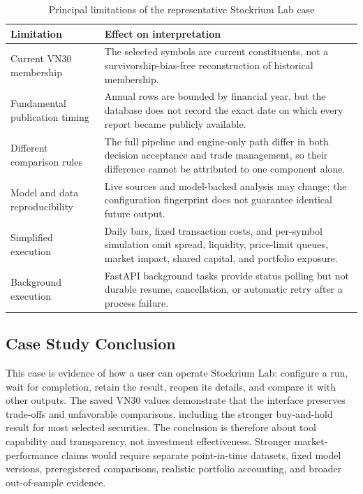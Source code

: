 \begin{table}[H]
    \centering
    \caption{Principal limitations of the representative Stockrium Lab case}
    \label{tab:case-study-limitations}
    \footnotesize
    \renewcommand{\arraystretch}{1.2}
    \begin{tabularx}{\textwidth}{>{\raggedright\arraybackslash}p{3.5cm} X}
        \toprule
        \textbf{Limitation} & \textbf{Effect on interpretation} \\
        \midrule
        Current VN30 membership & The selected symbols are current constituents, not a survivorship-bias-free reconstruction of historical membership. \\
        \addlinespace
        Fundamental publication timing & Annual rows are bounded by financial year, but the database does not record the exact date on which every report became publicly available. \\
        \addlinespace
        Different comparison rules & The full pipeline and engine-only path differ in both decision acceptance and trade management, so their difference cannot be attributed to one component alone. \\
        \addlinespace
        Model and data reproducibility & Live sources and model-backed analysis may change; the configuration fingerprint does not guarantee identical future output. \\
        \addlinespace
        Simplified execution & Daily bars, fixed transaction costs, and per-symbol simulation omit spread, liquidity, price-limit queues, market impact, shared capital, and portfolio exposure. \\
        \addlinespace
        Background execution & FastAPI background tasks provide status polling but not durable resume, cancellation, or automatic retry after a process failure. \\
        \bottomrule
    \end{tabularx}
\end{table}

\subsection{Case Study Conclusion}
\label{subsec:case-study-conclusion}

This case is evidence of how a user can operate Stockrium Lab: configure a run, wait for completion, retain the result, reopen its details, and compare it with other outputs. The saved VN30 values demonstrate that the interface preserves trade-offs and unfavorable comparisons, including the stronger buy-and-hold result for most selected securities. The conclusion is therefore about tool capability and transparency, not investment effectiveness. Stronger market-performance claims would require separate point-in-time datasets, fixed model versions, preregistered comparisons, realistic portfolio accounting, and broader out-of-sample evidence.
